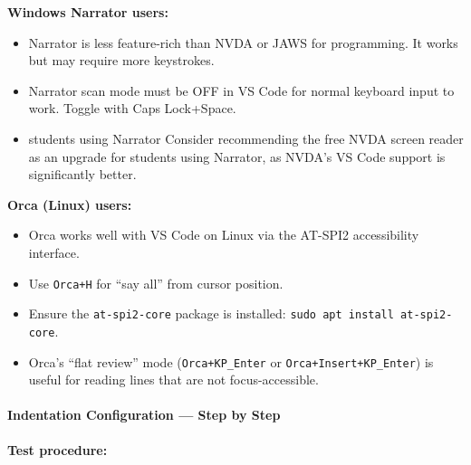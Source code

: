 \documentclass[
  justified,
  openright,
]{tufte-book}
\let\paragraph\paragraph
\let\paragraph\paragraph
\providecommand{\tightlist}{%
  \setlength{\itemsep}{0pt}\setlength{\parskip}{0pt}}
\begin{document}
\textbf{Windows Narrator users:}

\begin{itemize}
\tightlist
\item
  Narrator is less feature-rich than NVDA or JAWS for programming. It
  works but may require more keystrokes.
\item
  Narrator scan mode must be OFF in VS Code for normal keyboard input to
  work. Toggle with Caps Lock+Space.
\item
   students using Narrator
Consider recommending the free NVDA screen reader as an upgrade for
  students using Narrator, as NVDA's VS Code support is significantly
  better.
\end{itemize}

\textbf{Orca (Linux) users:}

\begin{itemize}
\tightlist
\item
  Orca works well with VS Code on Linux via the AT-SPI2 accessibility
  interface.
\item
  Use \texttt{Orca+H} for ``say all'' from cursor position.
\item
  Ensure the \texttt{at-spi2-core} package is installed:
  \texttt{sudo\ apt\ install\ at-spi2-core}.
\item
  Orca's ``flat review'' mode (\texttt{Orca+KP\_Enter} or
  \texttt{Orca+Insert+KP\_Enter}) is useful for reading lines that are
  not focus-accessible.
\end{itemize}

\paragraph{Indentation Configuration --- Step by
Step}\label{indentation-configuration-step-by-step}



\textbf{Test procedure:}
\end{document}
